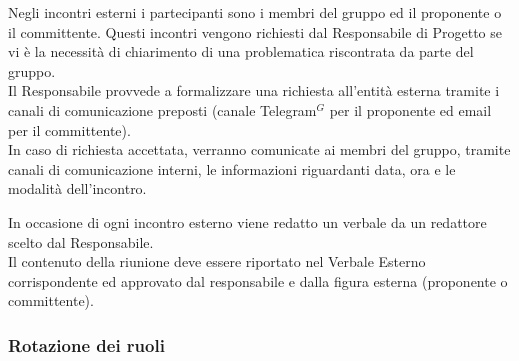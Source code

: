 
            Negli incontri esterni i partecipanti sono i membri del gruppo ed il proponente o il committente.
            Questi incontri vengono richiesti dal Responsabile di Progetto se vi è la necessità di chiarimento di una problematica riscontrata da parte del gruppo.     \\
            Il Responsabile provvede a formalizzare una richiesta all'entità esterna tramite i canali di comunicazione preposti (canale Telegram$^{G}$ per il proponente ed email per il committente).\\
            
            In caso di richiesta accettata, verranno comunicate ai membri del gruppo, tramite canali di comunicazione interni, le informazioni riguardanti data, ora e le modalità dell'incontro.

            In occasione di ogni incontro esterno viene redatto un verbale da un redattore scelto dal Responsabile.  \\
            Il contenuto della riunione deve essere riportato nel Verbale Esterno corrispondente ed approvato dal responsabile e dalla figura esterna (proponente o committente).

        \subsubsection{Rotazione dei ruoli}

